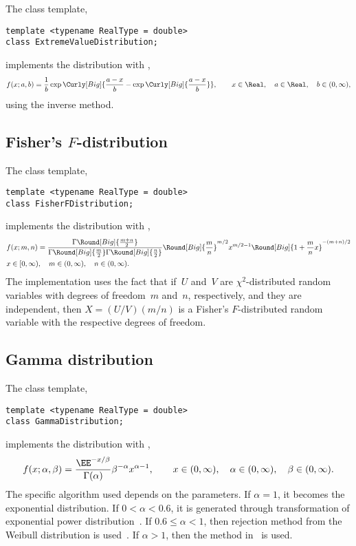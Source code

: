 The class template,
\begin{verbatim}
template <typename RealType = double>
class ExtremeValueDistribution;
\end{verbatim}
implements the distribution with \pdf,
\begin{equation*}
  f(x;a,b) =
  \frac{1}{b}\exp\Curly[Big]{
    \frac{a - x}{b} - \exp\Curly[Big]{\frac{a - x}{b}}},\qquad
  x \in \Real,\quad a \in \Real,\quad b \in (0, \infty),
\end{equation*}
using the inverse method.

\subsection{Fisher's \texorpdfstring{$F$}{F}-distribution}
\label{sub:Fisher's F-distribution}

The class template,
\begin{verbatim}
template <typename RealType = double>
class FisherFDistribution;
\end{verbatim}
implements the distribution with \pdf,
\begin{align*}
  & f(x;m,n) =
  \frac{\Gamma\Round[Big]{\frac{m + n}{2}}}{
    \Gamma\Round[Big]{\frac{m}{2}}\Gamma\Round[Big]{\frac{n}{2}}}
  \Round[Big]{\frac{m}{n}}^{m/2} x^{m / 2 - 1}
  \Round[Big]{1 + \frac{m}{n}x}^{-(m + n) / 2} \\
  & x \in [0, \infty),\quad m \in (0, \infty),\quad n \in (0, \infty).
\end{align*}
The implementation uses the fact that if~$U$ and~$V$ are $\chi^2$-distributed
random variables with degrees of freedom~$m$ and~$n$, respectively, and they
are independent, then $X = (U / V)(m / n)$ is a Fisher's $F$-distributed random
variable with the respective degrees of freedom.

\subsection{Gamma distribution}
\label{sub:Gamma distribution}

The class template,
\begin{verbatim}
template <typename RealType = double>
class GammaDistribution;
\end{verbatim}
implements the distribution with \pdf,
\begin{equation*}
  f(x;\alpha,\beta) =
  \frac{\EE^{-x/\beta}}{\Gamma(\alpha)}\beta^{-\alpha}x^{\alpha-1},\qquad
  x \in (0, \infty),\quad \alpha \in (0, \infty),\quad \beta \in (0, \infty).
\end{equation*}
The specific algorithm used depends on the parameters. If $\alpha = 1$, it
becomes the exponential distribution. If $0 < \alpha < 0.6$, it is generated
through transformation of exponential power
distribution~\cite[sec~2.6]{Devroye:1986gi}. If $0.6\le\alpha<1$, then
rejection method from the Weibull distribution is
used~\cite[sec.~3.4]{Devroye:1986gi}. If $\alpha > 1$, then the method
in~\cite{Marsaglia:2000vq} is used.


